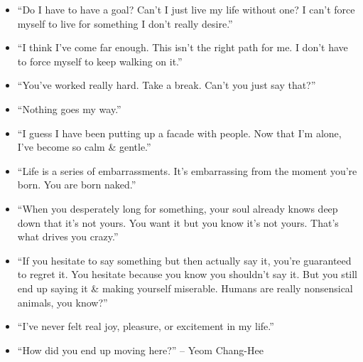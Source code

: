 \documentclass{article}
\begin{document}
\begin{enumerate}
\begin{itemize}
		\item ``Do I have to have a goal? Can't I just live my life without one? I can't force myself to live for something I don't really desire.''
		\item ``I think I've come far enough. This isn't the right path for me. I don't have to force myself to keep walking on it.''
		\item ``You've worked really hard. Take a break. Can't you just say that?''
		\item ``Nothing goes my way.''
		\item ``I guess I have been putting up a facade with people. Now that I'm alone, I've become so calm \& gentle.''
		\item ``Life is a series of embarrassments. It's embarrassing from the moment you're born. You are born naked.''
		\item ``When you desperately long for something, your soul already knows deep down that it's not yours. You want it but you know it's not yours. That's what drives you crazy.''
		\item ``If you hesitate to say something but then actually say it, you're guaranteed to regret it. You hesitate because you know you shouldn't say it. But you still end up saying it \& making yourself miserable. Humans are really nonsensical animals, you know?''
		\item ``I've never felt real joy, pleasure, or excitement in my life.''
		\item ``How did you end up moving here?'' -- Yeom Chang-Hee
		

\end{itemize}
\end{enumerate}
\end{document}
